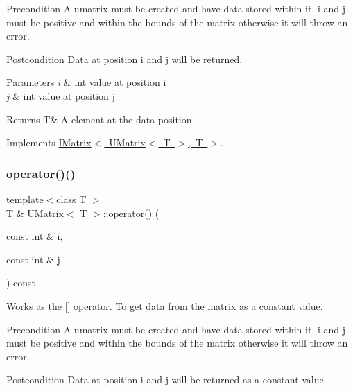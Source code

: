 \begin{DoxyPrecond}{Precondition}
A umatrix must be created and have data stored within it. i and j must be positive and within the bounds of the matrix otherwise it will throw an error. 
\end{DoxyPrecond}
\begin{DoxyPostcond}{Postcondition}
Data at position i and j will be returned.
\end{DoxyPostcond}

\begin{DoxyParams}{Parameters}
{\em i} & int value at position i \\
\hline
{\em j} & int value at position j \\
\hline
\end{DoxyParams}
\begin{DoxyReturn}{Returns}
T\& A element at the data position 
\end{DoxyReturn}


Implements \mbox{\hyperlink{class_i_matrix_a1e4246d163aaca1b224dec8839645ea9}{I\+Matrix$<$ U\+Matrix$<$ T $>$, T $>$}}.

\mbox{\label{class_u_matrix_a2fbb6915ab1a6bb7a8944b51600b6d2d}} 
\subsubsection{\texorpdfstring{operator()()}{operator()()}\hspace{0.1cm}{\footnotesize\ttfamily [2/2]}}
{\footnotesize\ttfamily template$<$class T $>$ \\
T \& \mbox{\hyperlink{class_u_matrix}{U\+Matrix}}$<$ T $>$\+::operator() (\begin{DoxyParamCaption}\item[{const int \&}]{i,  }\item[{const int \&}]{j }\end{DoxyParamCaption}) const\hspace{0.3cm}{\ttfamily [virtual]}}



Works as the \mbox{[}\mbox{]} operator. To get data from the matrix as a constant value. 

\begin{DoxyPrecond}{Precondition}
A umatrix must be created and have data stored within it. i and j must be positive and within the bounds of the matrix otherwise it will throw an error. 
\end{DoxyPrecond}
\begin{DoxyPostcond}{Postcondition}
Data at position i and j will be returned as a constant value.
\end{DoxyPostcond}

